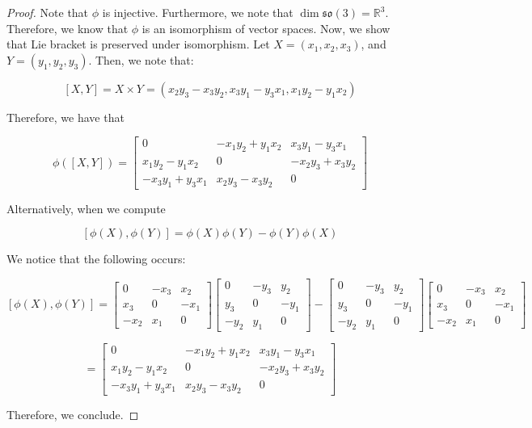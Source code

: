 \begin{proof}
Note that $\phi$ is injective. Furthermore, we note that $\dim \mathfrak{so}(3) = \mathbb{R}^3$. Therefore, we know that $\phi$ is an isomorphism of vector spaces. Now, we show that Lie bracket is preserved under isomorphism. Let $X = (x_{1}, x_{2}, x_{3})$, and $Y = (y_{1}, y_{2}, y_{3})$. Then, we note that:

$$[X,Y] = X \times Y = (x_{2} y_{3} - x_{3} y_{2}, x_{3} y_{1} - y_{3} x_{1}, x_{1} y_{2} - y_{1} x_{2})$$

\noindent Therefore, we have that 

$$\phi([X,Y]) = \begin{bmatrix}
0 & -x_{1} y_{2} + y_{1} x_{2} & x_{3} y_{1} - y_{3} x_{1} \\
x_{1} y_{2} - y_{1} x_{2} & 0 & -x_{2} y_{3} + x_{3} y_{2} \\
-x_{3} y_{1} + y_{3} x_{1} & x_{2} y_{3} - x_{3} y_{2} & 0
\end{bmatrix}$$

\noindent Alternatively, when we compute 

$$[\phi(X), \phi(Y)] = \phi(X) \phi(Y) - \phi(Y) \phi(X)$$

\noindent We notice that the following occurs: 

$$[\phi(X), \phi(Y)]  = \begin{bmatrix}
0 & -x_3 & x_2 \\
x_3 & 0 & -x_1 \\
-x_2 & x_1 & 0
\end{bmatrix} \begin{bmatrix}
0 & -y_3 & y_2 \\
y_3 & 0 & -y_1 \\
-y_2 & y_1 & 0
\end{bmatrix} - \begin{bmatrix}
0 & -y_3 & y_2 \\
y_3 & 0 & -y_1 \\
-y_2 & y_1 & 0
\end{bmatrix} \begin{bmatrix}
0 & -x_3 & x_2 \\
x_3 & 0 & -x_1 \\
-x_2 & x_1 & 0
\end{bmatrix} $$

$$= \begin{bmatrix}
0 & -x_{1} y_{2} + y_{1} x_{2} & x_{3} y_{1} - y_{3} x_{1} \\
x_{1} y_{2} - y_{1} x_{2} & 0 & -x_{2} y_{3} + x_{3} y_{2} \\
-x_{3} y_{1} + y_{3} x_{1} & x_{2} y_{3} - x_{3} y_{2} & 0
\end{bmatrix}$$

\noindent Therefore, we conclude.
\end{proof}

